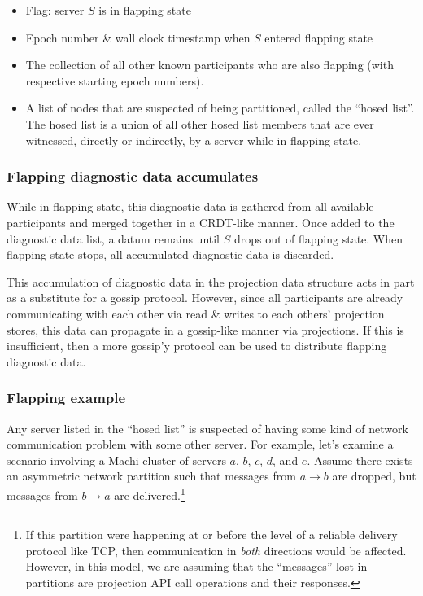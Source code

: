 \documentclass[preprint,10pt]{sigplanconf}
\begin{document}
\begin{itemize}
\item Flag: server $S$ is in flapping state
\item Epoch number \& wall clock timestamp when $S$ entered flapping state
\item The collection of all other known participants who are also
  flapping (with respective starting epoch numbers).
\item A list of nodes that are suspected of being partitioned, called the
  ``hosed list''.  The hosed list is a union of all other hosed list
  members that are ever witnessed, directly or indirectly, by a server
  while in flapping state.
\end{itemize}

\subsubsection{Flapping diagnostic data accumulates}

While in flapping state, this diagnostic data is gathered from
all available participants and merged together in a CRDT-like manner.
Once added to the diagnostic data list, a datum remains until
$S$ drops out of flapping state.  When flapping state stops, all
accumulated diagnostic data is discarded.

This accumulation of diagnostic data in the projection data
structure acts in part as a substitute for a gossip protocol.
However, since all participants are already communicating with each
other via read \& writes to each others' projection stores, this
data can propagate in a gossip-like manner via projections.  If
this is insufficient, then a more gossip'y protocol can be used to
distribute flapping diagnostic data.

\subsubsection{Flapping example}
\label{ssec:flapping-example}

Any server listed in the ``hosed list'' is suspected of having some
kind of network communication problem with some other server.  For
example, let's examine a scenario involving a Machi cluster of servers
$a$, $b$, $c$, $d$, and $e$.  Assume there exists an asymmetric network
partition such that messages from $a \rightarrow b$ are dropped, but
messages from $b \rightarrow a$ are delivered.\footnote{If this
  partition were happening at or before the level of a reliable
  delivery protocol like TCP, then communication in {\em both}
  directions would be affected.  However, in this model, we are
  assuming that the ``messages'' lost in partitions are projection API
  call operations and their responses.}
\end{document}
